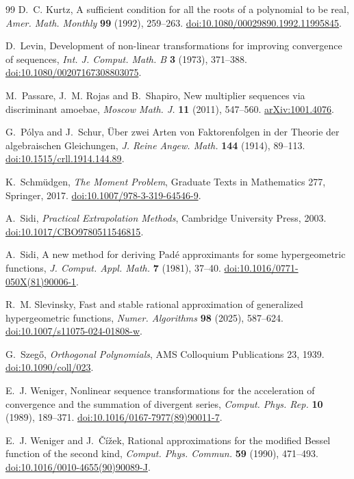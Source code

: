 \documentclass[11pt,a4paper]{article}
\theoremstyle{definition}
\theoremstyle{remark}
\begin{document}
\begin{thebibliography}{99}
D.~C. Kurtz, A sufficient condition for all the roots of a polynomial to be
real, \emph{Amer. Math. Monthly} \textbf{99} (1992), 259--263.
\href{https://doi.org/10.1080/00029890.1992.11995845}{doi:10.1080/00029890.1992.11995845}.

D.~Levin, Development of non-linear transformations for improving
convergence of sequences, \emph{Int. J. Comput. Math. B} \textbf{3} (1973),
371--388.
\href{https://doi.org/10.1080/00207167308803075}{doi:10.1080/00207167308803075}.

M.~Passare, J.~M. Rojas and B.~Shapiro, New multiplier sequences via
discriminant amoebae, \emph{Moscow Math. J.} \textbf{11} (2011), 547--560.
\href{https://arxiv.org/abs/1001.4076}{arXiv:1001.4076}.

G.~Pólya and J.~Schur, Über zwei Arten von Faktorenfolgen in der Theorie
der algebraischen Gleichungen, \emph{J. Reine Angew. Math.} \textbf{144}
(1914), 89--113.
\href{https://doi.org/10.1515/crll.1914.144.89}{doi:10.1515/crll.1914.144.89}.

K.~Schmüdgen, \emph{The Moment Problem}, Graduate Texts in Mathematics 277,
Springer, 2017.
\href{https://doi.org/10.1007/978-3-319-64546-9}{doi:10.1007/978-3-319-64546-9}.

A.~Sidi, \emph{Practical Extrapolation Methods}, Cambridge University
Press, 2003.
\href{https://doi.org/10.1017/CBO9780511546815}{doi:10.1017/CBO9780511546815}.

A.~Sidi, A new method for deriving Padé approximants for some
hypergeometric functions, \emph{J. Comput. Appl. Math.} \textbf{7} (1981),
37--40.
\href{https://doi.org/10.1016/0771-050X(81)90006-1}{doi:10.1016/0771-050X(81)90006-1}.

R.~M. Slevinsky, Fast and stable rational approximation of generalized
hypergeometric functions, \emph{Numer. Algorithms} \textbf{98} (2025),
587--624.
\href{https://doi.org/10.1007/s11075-024-01808-w}{doi:10.1007/s11075-024-01808-w}.

G.~Szegő, \emph{Orthogonal Polynomials}, AMS Colloquium Publications 23,
1939.
\href{https://doi.org/10.1090/coll/023}{doi:10.1090/coll/023}.

E.~J. Weniger, Nonlinear sequence transformations for the acceleration of
convergence and the summation of divergent series, \emph{Comput. Phys.
Rep.} \textbf{10} (1989), 189--371.
\href{https://doi.org/10.1016/0167-7977(89)90011-7}{doi:10.1016/0167-7977(89)90011-7}.

E.~J. Weniger and J.~Čížek, Rational approximations for the modified
Bessel function of the second kind, \emph{Comput. Phys. Commun.}
\textbf{59} (1990), 471--493.
\href{https://doi.org/10.1016/0010-4655(90)90089-J}{doi:10.1016/0010-4655(90)90089-J}.

\end{thebibliography}
\end{document}
